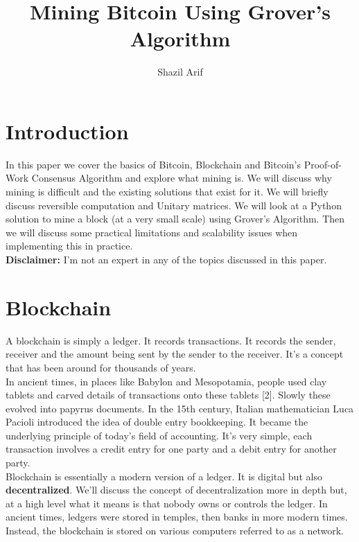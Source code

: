 \documentclass[11pt]{article} %
\title{Mining Bitcoin Using Grover's Algorithm}
\author{Shazil Arif}
\begin{document}
\maketitle

\tableofcontents

\section{Introduction}{}

In this paper we cover the basics of Bitcoin, Blockchain and Bitcoin's Proof-of-Work Consensus Algorithm and explore what mining is. We will discuss why mining is difficult and the existing solutions that exist for it. We will briefly discuss reversible computation and Unitary matrices. We will look at a Python solution to mine a block (at a very small scale) using Grover's Algorithm. Then we will discuss some practical limitations and scalability issues when implementing this in practice.\\


\noindent \textbf{Disclaimer:} I'm not an expert in any of the topics discussed in this paper.

\section{Blockchain}{}

A blockchain is simply a ledger. It records transactions. It records the sender, receiver and the amount being sent by the sender to the receiver. It's a concept that has been around for thousands of years.\\

\noindent In ancient times, in places like Babylon and Mesopotamia, people used clay tablets and carved details of transactions onto these tablets [2]. Slowly these evolved into papyrus documents. In the 15th century, Italian mathematician Luca Pacioli introduced the idea of double entry bookkeeping. It became the underlying principle of today's field of accounting. It's very simple, each transaction involves a credit entry for one party and a debit entry for another party.\\

\noindent Blockchain is essentially a modern version of a ledger. It is digital but also \textbf{decentralized}. We'll discuss the concept of decentralization more in depth but, at a high level what it means is that nobody owns or controls the ledger. In ancient times, ledgers were stored in temples, then banks in more modern times. Instead, the blockchain is stored on various computers referred to as a network.\\
\end{document}
